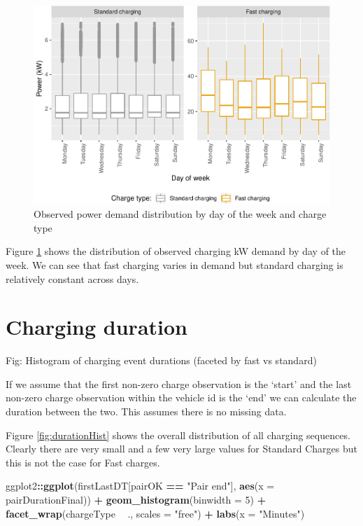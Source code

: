 \documentclass[]{article}
\newenvironment{Shaded}{\begin{snugshade}}{\end{snugshade}}
\newcommand{\KeywordTok}[1]{\textcolor[rgb]{0.13,0.29,0.53}{\textbf{#1}}}
\newcommand{\DataTypeTok}[1]{\textcolor[rgb]{0.13,0.29,0.53}{#1}}
\newcommand{\DecValTok}[1]{\textcolor[rgb]{0.00,0.00,0.81}{#1}}
\newcommand{\StringTok}[1]{\textcolor[rgb]{0.31,0.60,0.02}{#1}}
\newcommand{\OperatorTok}[1]{\textcolor[rgb]{0.81,0.36,0.00}{\textbf{#1}}}
\newcommand{\NormalTok}[1]{#1}
\begin{document}
\begin{figure}
\centering
\includegraphics{EVBB_SummaryReport_files/figure-latex/dailyPower-1.pdf}
\caption{\label{fig:dailyPower}Observed power demand distribution by day of
the week and charge type}
\end{figure}

Figure \ref{fig:dailyPower} shows the distribution of observed charging
kW demand by day of the week. We can see that fast charging varies in
demand but standard charging is relatively constant across days.

\section{Charging duration}\label{duration}

Fig: Histogram of charging event durations (faceted by fast vs standard)

If we assume that the first non-zero charge observation is the `start'
and the last non-zero charge observation within the vehicle id is the
`end' we can calculate the duration between the two. This assumes there
is no missing data.

Figure \ref{fig:durationHist} shows the overall distribution of all
charging sequences. Clearly there are very small and a few very large
values for Standard Charges but this is not the case for Fast charges.

\begin{Shaded}
\begin{Highlighting}[]
\NormalTok{ggplot2}\OperatorTok{::}\KeywordTok{ggplot}\NormalTok{(firstLastDT[pairOK }\OperatorTok{==}\StringTok{ "Pair end"}\NormalTok{], }
                \KeywordTok{aes}\NormalTok{(}\DataTypeTok{x =}\NormalTok{ pairDurationFinal)) }\OperatorTok{+}
\StringTok{  }\KeywordTok{geom_histogram}\NormalTok{(}\DataTypeTok{binwidth =} \DecValTok{5}\NormalTok{) }\OperatorTok{+}
\StringTok{  }\KeywordTok{facet_wrap}\NormalTok{(chargeType }\OperatorTok{~}\StringTok{ }\NormalTok{., }\DataTypeTok{scales =} \StringTok{"free"}\NormalTok{) }\OperatorTok{+}
\StringTok{  }\KeywordTok{labs}\NormalTok{(}\DataTypeTok{x =} \StringTok{"Minutes"}\NormalTok{)}
\end{Highlighting}
\end{Shaded}
\end{document}
